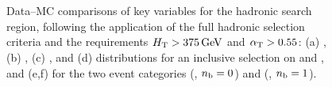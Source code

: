 \begin{figure}[h!]
{  } 
   \\
   \\
  \caption{\label{fig:control-plots-sig} Data--MC comparisons of key
    variables for the hadronic search region, following the
    application of the full hadronic selection criteria and the
    requirements $\mbox{$H_\text{T}$} > 375\,\text{Ge\hspace{-.08em}V}$ and $\alpha_{\text{T}} > 0.55$: (a) \njet,
    (b) \nb, (c) \mht, and (d) \met distributions for an inclusive 
    selection on \njet and \nb, and (e,f) \scalht  for the two 
    event categories (\njetlow, $n_{\text{b}} = 0$) and (\njethigh, $n_{\text{b}} = 1$). }
\end{figure}

\FloatBarrier
